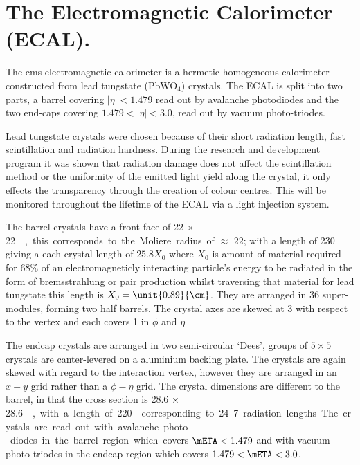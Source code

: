 
\section{The Electromagnetic Calorimeter (ECAL).} %
\label{sec:the_electromagnetic_calorimeter}
The \ac{cms} electromagnetic calorimeter\cite{ref:cmsecaltdr} is a hermetic 
homogeneous calorimeter constructed from lead tungstate (PbWO$_{4}$) crystals. 
The ECAL is split into two parts, a barrel covering $|\eta| < 1.479$ read out 
by avalanche photodiodes and the two end-caps covering $1.479 < |\eta| < 3.0$, 
read out by vacuum photo-triodes.

Lead tungstate crystals were chosen because of their short radiation length, 
fast scintillation and radiation hardness. During the research and development 
program it was shown that radiation damage does not affect the scintillation 
method or the uniformity of the emitted light yield along the crystal, it only 
effects the transparency through the creation of colour centres. This will be 
monitored throughout the lifetime of the ECAL via a light injection 
system\cite{Smith:2000p5245}.

The barrel crystals have a front face of \unit{22 $\times$ 22}{\mm\squared}, 
this corresponds to the Moliere radius of $\approx $ \unit{22}{\mm}; with a 
length of \unit{230}{\mm} giving a each crystal length of $25.8 X_{0}$ where 
$X_{0}$ is amount of material required for 68$\%$ of an electromagneticly 
interacting particle's energy to be radiated in the form of bremsstrahlung or 
pair production whilst traversing that material for lead tungstate this length 
is $X_{0}= \unit{0.89}{\cm}$. They are arranged in 36 super-modules, forming 
two half barrels. The crystal axes are skewed at \unit{3}{\degree} with respect 
to the vertex and each covers \unit{1}{\degree} in $\phi$ and $\eta$

The endcap crystals are arranged in two semi-circular `Dees', groups of 
$5\times 5$ crystals are canter-levered on a aluminium backing plate. The 
crystals are again skewed with regard to the interaction vertex, however they 
are arranged in an $x-y$ grid rather than a $\phi - \eta$ grid. The crystal 
dimensions are different to the barrel, in that the cross section is \unit{28.6 
$\times$ 28.6}{\mm\squared}, with a length of \unit{220}{\mm} corresponding to 
24.7 radiation lengths

The crystals are read out with avalanche photo-diodes in the barrel region 
which covers $\mETA < 1.479$ and with vacuum photo-triodes in the endcap 
region which covers $1.479 < \mETA < 3.0$.

